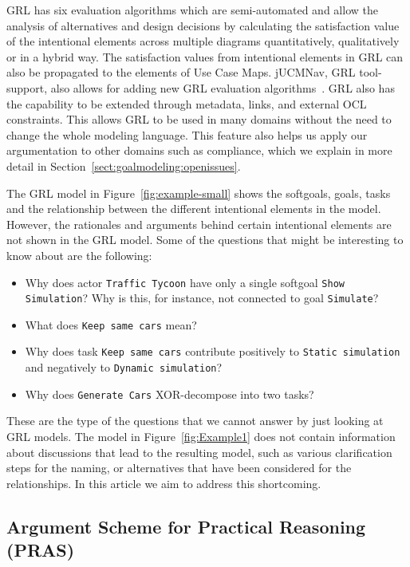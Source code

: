 GRL has six evaluation algorithms which are semi-automated and allow the analysis of alternatives and design decisions by calculating the satisfaction value of the intentional elements across multiple diagrams quantitatively, qualitatively or in a hybrid way. The satisfaction values from intentional elements in GRL can also be propagated to the elements of Use Case Maps.  jUCMNav, GRL tool-support, also allows for adding new GRL evaluation algorithms~\cite{jUCMNav}. GRL also has the capability to be extended through metadata, links, and external OCL constraints. This allows GRL to be used in many domains without the need to change the whole modeling language. This feature also helps us apply our argumentation to other domains such as compliance, which we explain in more detail in Section~\ref{sect:goalmodeling:openissues}.

The GRL model in Figure~\ref{fig:example-small} shows the softgoals, goals, tasks and the relationship between the different intentional elements in the model. However, the rationales and arguments behind certain intentional elements are not shown in the GRL model. Some of the questions that might be interesting to know about are the following:

\begin{itemize}
	\item Why does actor \texttt{Traffic Tycoon} have only a single softgoal \texttt{Show Simulation}? Why is this, for instance, not connected to goal \texttt{Simulate}? %
	\item What does \texttt{Keep same cars} mean?
	\item Why does task \texttt{Keep same cars} contribute positively to \texttt{Static simulation} and negatively to \texttt{Dynamic simulation}?
	\item Why does \texttt{Generate Cars} XOR-decompose into two tasks?
\end{itemize}

These are the type of the questions that we cannot answer by just looking at GRL models. The model in Figure~\ref{fig:Example1} does not contain information about discussions that lead to the resulting model, such as various clarification steps for the naming, or alternatives that have been considered for the relationships. In this article we aim to address this shortcoming.

\subsection{Argument Scheme for Practical Reasoning (PRAS)}
\label{sect:background:pras}

